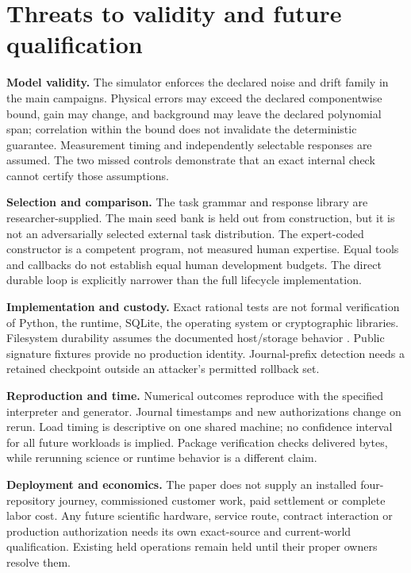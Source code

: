 \documentclass[11pt]{article}
\begin{document}
\section{Threats to validity and future qualification}

\textbf{Model validity.} The simulator enforces the declared noise and drift family in the main campaigns. Physical errors may exceed the declared componentwise bound, gain may change, and background may leave the declared polynomial span; correlation within the bound does not invalidate the deterministic guarantee. Measurement timing and independently selectable responses are assumed. The two missed controls demonstrate that an exact internal check cannot certify those assumptions.

\textbf{Selection and comparison.} The task grammar and response library are researcher-supplied. The main seed bank is held out from construction, but it is not an adversarially selected external task distribution. The expert-coded constructor is a competent program, not measured human expertise. Equal tools and callbacks do not establish equal human development budgets. The direct durable loop is explicitly narrower than the full lifecycle implementation.

\textbf{Implementation and custody.} Exact rational tests are not formal verification of Python, the runtime, SQLite, the operating system or cryptographic libraries. Filesystem durability assumes the documented host/storage behavior \cite{sqlite,sqlite_wal}. Public signature fixtures provide no production identity. Journal-prefix detection needs a retained checkpoint outside an attacker's permitted rollback set.

\textbf{Reproduction and time.} Numerical outcomes reproduce with the specified interpreter and generator. Journal timestamps and new authorizations change on rerun. Load timing is descriptive on one shared machine; no confidence interval for all future workloads is implied. Package verification checks delivered bytes, while rerunning science or runtime behavior is a different claim.

\textbf{Deployment and economics.} The paper does not supply an installed four-repository journey, commissioned customer work, paid settlement or complete labor cost. Any future scientific hardware, service route, contract interaction or production authorization needs its own exact-source and current-world qualification. Existing held operations remain held until their proper owners resolve them.
\end{document}
